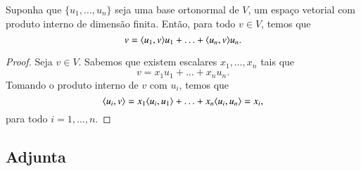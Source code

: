 \begin{teo}
  Suponha que $\{u_1,\ldots,u_n\}$ seja uma base ortonormal de $V$, um espaço vetorial com produto interno de dimensão finita. Então, para todo $v\in V$, temos que
  \begin{equation*}
    v = \langle u_1, v \rangle u_1+\ldots+ \langle u_n, v \rangle u_n.
  \end{equation*}
\end{teo}
\begin{proof}
Seja $v\in V$. Sabemos que existem escalares $x_1,\ldots,x_n$ tais que
\begin{equation*}
  v = x_1u_1+\ldots+x_nu_n.
\end{equation*}
Tomando o produto interno de $v$ com $u_i$, temos que
\begin{equation*}
  \langle u_i, v \rangle = x_1\langle u_i, u_1 \rangle+\ldots+x_n\langle u_i, u_n \rangle = x_i,
\end{equation*}
para todo $i=1,\ldots,n$.
\end{proof}

\subsection{Adjunta}



